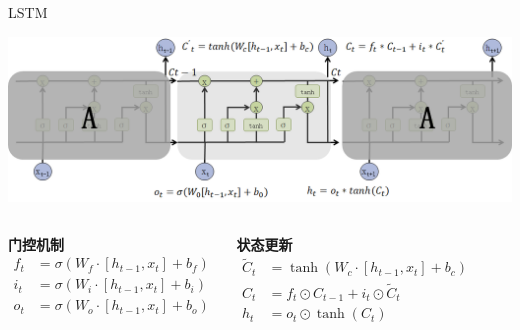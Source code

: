 \documentclass{beamer}
\begin{document}
\begin{frame}{LSTM}
    \begin{center}
        \includegraphics[width=\textwidth]{pic/LSTM.png}
    \end{center}

    \vspace{0.2cm}
    \begin{columns}
        \textbf{门控机制}
        \begin{align*}
            f_t & = \sigma(W_f \cdot [h_{t-1}, x_t] + b_f) \\
            i_t & = \sigma(W_i \cdot [h_{t-1}, x_t] + b_i) \\
            o_t & = \sigma(W_o \cdot [h_{t-1}, x_t] + b_o)
        \end{align*}

        \textbf{状态更新}
        \begin{align*}
            \tilde{C}_t & = \tanh(W_c \cdot [h_{t-1}, x_t] + b_c) \\
            C_t & = f_t \odot C_{t-1} + i_t \odot \tilde{C}_t \\
            h_t & = o_t \odot \tanh(C_t)
        \end{align*}
    \end{columns}

\end{frame}
\end{document}

